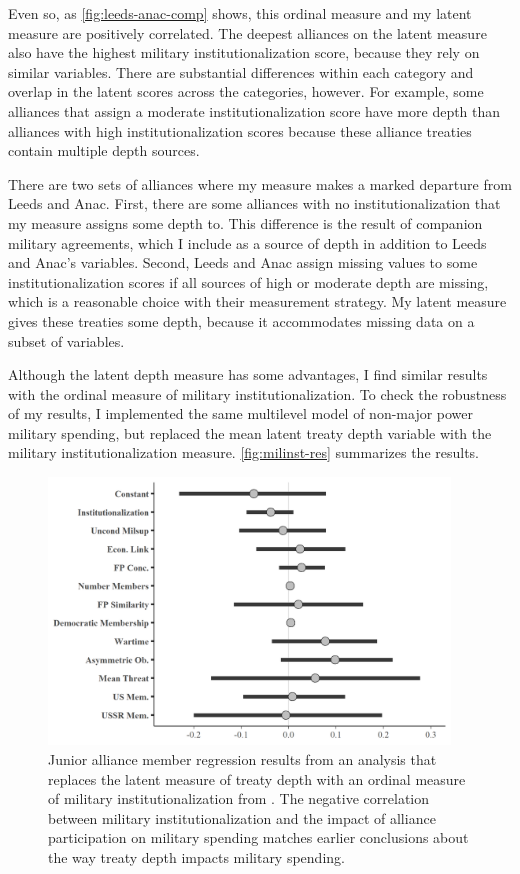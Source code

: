 \documentclass[12pt]{article}
\begin{document}
Even so, as \autoref{fig:leeds-anac-comp} shows, this ordinal measure and my latent measure are positively correlated. 
The deepest alliances on the latent measure also have the highest military institutionalization score, because they rely on similar variables. 
There are substantial differences within each category and overlap in the latent scores across the categories, however. 
For example, some alliances that \citet{LeedsAnac2005} assign a moderate institutionalization score have more depth than alliances with high institutionalization scores because these alliance treaties contain multiple depth sources.

There are two sets of alliances where my measure makes a marked departure from Leeds and Anac. 
First, there are some alliances with no institutionalization that my measure assigns some depth to. 
This difference is the result of companion military agreements, which I include as a source of depth in addition to Leeds and Anac's variables. 
Second, Leeds and Anac assign missing values to some institutionalization scores if all sources of high or moderate depth are missing, which is a reasonable choice with their measurement strategy.
My latent measure gives these treaties some depth, because it accommodates missing data on a subset of variables. 


Although the latent depth measure has some advantages, I find similar results with the ordinal measure of military institutionalization. 
To check the robustness of my results, I implemented the same multilevel model of non-major power military spending, but replaced the mean latent treaty depth variable with the military institutionalization measure. 
\autoref{fig:milinst-res} summarizes the results. 


\begin{figure}[htbp]
	\centering
		\includegraphics[width=0.95\textwidth]{alliance-reg-milinst.png}
\caption{Junior alliance member regression results from an analysis that replaces the latent measure of treaty depth with an ordinal measure of military institutionalization from \citet{LeedsAnac2005}. The negative correlation between military institutionalization and the impact of alliance participation on military spending matches earlier conclusions about the way treaty depth impacts military spending.}
\label{fig:milinst-res}
\end{figure}
\end{document}
